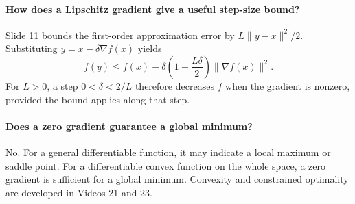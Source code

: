 \documentclass[10pt,english]{article}
\begin{document}
\paragraph{How does a Lipschitz gradient give a useful step-size bound?}
Slide 11 bounds the first-order approximation error by $L\|y-x\|^2/2$.
Substituting $y=x-\delta\nabla f(x)$ yields
\[
f(y)\leq f(x)-\delta\left(1-\frac{L\delta}{2}\right)\|\nabla f(x)\|^2.
\]
For $L>0$, a step $0<\delta<2/L$ therefore decreases $f$ when the gradient is nonzero, provided the bound applies along that step.

\paragraph{Does a zero gradient guarantee a global minimum?}
No. For a general differentiable function, it may indicate a local maximum or saddle point.
For a differentiable convex function on the whole space, a zero gradient is sufficient for a global minimum.
Convexity and constrained optimality are developed in Videos 21 and 23.
\end{document}
